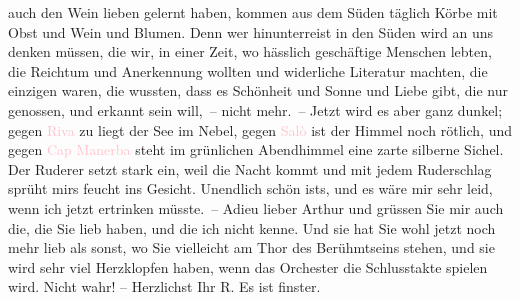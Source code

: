                auch den Wein lieben gelernt haben, kommen aus dem Süden täglich Körbe mit Obst und
               Wein und Blumen. Denn wer hinunterreist in den Süden wird an uns denken müssen, die
               wir, in einer Zeit, wo hässlich geschäftige Menschen lebten, die Reichtum und
               Anerkennung wollten und widerliche Literatur machten, die einzigen waren, die
               wussten, dass es Schönheit und Sonne und Liebe gibt, die nur genossen, und erkannt
               sein will, – nicht mehr. – Jetzt wird es aber ganz dunkel; gegen \textcolor{pink}{Riva}{}\ledrightnote{\textcolor{pink}{Riva del Garda}} zu liegt der See im Nebel, gegen \textcolor{pink}{Salò}{}\ledrightnote{\textcolor{pink}{Salò}} ist der Himmel noch rötlich, und gegen \textcolor{pink}{Cap Manerba}{}\ledrightnote{\textcolor{pink}{Manerba del Garda}} steht im grünlichen Abendhimmel eine zarte silberne
                  {\pb}Sichel. Der Ruderer setzt stark ein, weil die
               Nacht kommt und mit jedem Ruderschlag sprüht mirs feucht ins Gesicht. Unendlich schön
               ists, und es wäre mir sehr leid, wenn ich jetzt ertrinken müsste. – Adieu lieber
               Arthur und grüssen Sie mir auch die, die Sie lieb haben, und die ich nicht kenne. Und
               sie hat Sie wohl jetzt noch mehr lieb als sonst, wo Sie vielleicht am Thor des
               Berühmtseins stehen, und sie wird sehr viel Herzklopfen haben, wenn das Orchester die
               Schlusstakte spielen wird. Nicht wahr! – Herzlichst Ihr\pend
           \pstart \spacefill\mbox{R.}\pend{}\pstart
           \noindent{}Es ist finster.\pend
           \endnumbering{}  
      